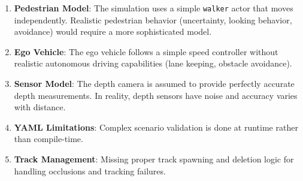 \begin{enumerate}
    \item \textbf{Pedestrian Model}: The simulation uses a simple \texttt{walker} actor that moves independently. Realistic pedestrian behavior (uncertainty, looking behavior, avoidance) would require a more sophisticated model.
    
    \item \textbf{Ego Vehicle}: The ego vehicle follows a simple speed controller without realistic autonomous driving capabilities (lane keeping, obstacle avoidance).
    
    \item \textbf{Sensor Model}: The depth camera is assumed to provide perfectly accurate depth measurements. In reality, depth sensors have noise and accuracy varies with distance.
    
    \item \textbf{YAML Limitations}: Complex scenario validation is done at runtime rather than compile-time.
    
    \item \textbf{Track Management}: Missing proper track spawning and deletion logic for handling occlusions and tracking failures.
\end{enumerate}